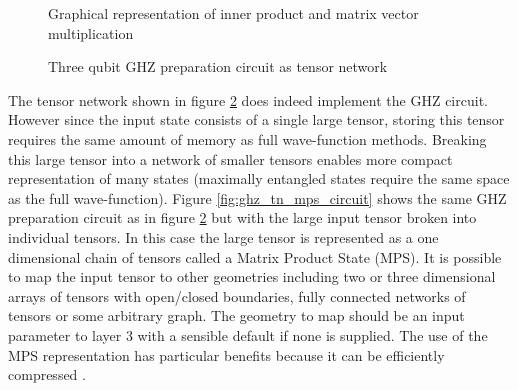 \begin{figure}\label{fig:basic_tensor_contractions}
\centering
{}
\caption{Graphical representation of inner product and matrix vector multiplication}
\end{figure}

\begin{figure}\label{fig:ghz_tn_circuit}
\centering
{}
\caption{Three qubit GHZ preparation circuit as tensor network}
\end{figure}

The tensor network shown in figure \ref{fig:ghz_tn_circuit} does indeed
implement the GHZ circuit. However since the input state consists of a single
large tensor, storing this tensor requires the same amount of memory as full
wave-function methods. Breaking this large tensor into a network of smaller
tensors enables more compact representation of many states (maximally entangled
states require the same space as the full wave-function). Figure
\ref{fig:ghz_tn_mps_circuit} shows the same GHZ preparation circuit as in figure
\ref{fig:ghz_tn_circuit} but with the large input tensor broken into
individual tensors. In this case the large tensor is represented as a one
dimensional chain of tensors called a Matrix Product State (MPS). It is possible
to map the input tensor to other geometries including two or three dimensional arrays of tensors
with open/closed boundaries, fully connected networks of tensors or some
arbitrary graph. The geometry to map should be an input parameter to layer 3
with a sensible default if none is supplied. The use of the MPS representation has
particular benefits because it can be efficiently compressed
\cite{Schollw_ck_2011, zhou2020limits}.

